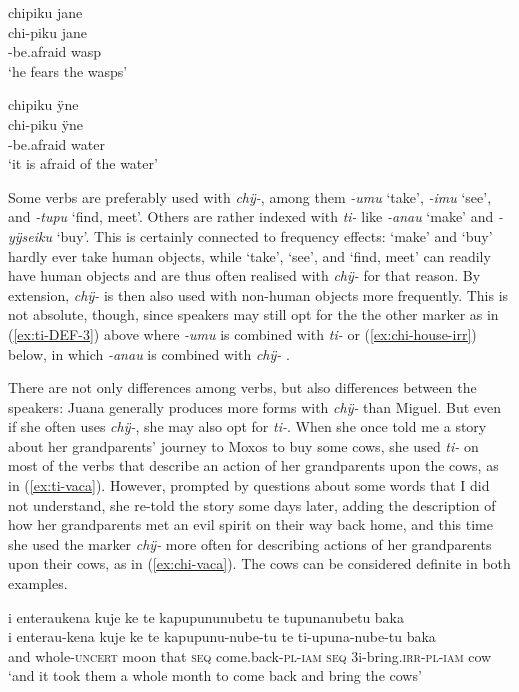 \ea\label{ex:fear}
\begingl 
\glpreamble chipiku jane\\
\gla chi-piku jane\\ 
-be.afraid wasp\\ 
\glft ‘he fears the wasps’\\ 
\endgl
\trailingcitation{[jxx-a120516l-a.125]}
\xe

\ea\label{ex:fear-2}
\begingl
\glpreamble chipiku ÿne\\
\gla chi-piku ÿne\\
-be.afraid water\\
\glft ‘it is afraid of the water’
\endgl
\trailingcitation{[jxx-a120516l-a.376]}
\xe

Some  verbs are preferably used with \textit{chÿ-}, among them \textit{-umu} ‘take’, \textit{-imu} ‘see’, and \textit{-tupu} ‘find, meet’. Others are rather indexed with \textit{ti-} like \textit{-anau} ‘make’ and \textit{-yÿseiku} ‘buy’. This is certainly connected to frequency effects: ‘make’ and ‘buy’ hardly ever take human objects, while ‘take’, ‘see’, and ‘find, meet’ can readily have human objects and are thus often realised with \textit{chÿ-} for that reason. By extension, \textit{chÿ-} is then also used with non-human objects more frequently. This is not absolute, though, since speakers may still opt for the the other marker as in  (\ref{ex:ti-DEF-3}) above where \textit{-umu} is combined with \textit{ti-} or  (\ref{ex:chi-house-irr}) below, in which \textit{-anau} is combined with \textit{chÿ-} .

There are not only differences among verbs, but also differences between the speakers: Juana generally produces more forms with \textit{chÿ-} than Miguel. But even if she often uses \textit{chÿ-}, she may also opt for \textit{ti-}. When she once told me a story about her grandparents’ journey to Moxos to buy some cows, she used \textit{ti-} on most of the verbs that describe an action of her grandparents upon the cows, as in (\ref{ex:ti-vaca}). However, prompted by questions about some words that I did not understand, she re-told the story some days later, adding the description of how her grandparents met an evil spirit on their way back home, and this time she used the marker \textit{chÿ-} more often for describing actions of her grandparents upon their cows, as in (\ref{ex:chi-vaca}). The cows can be considered definite in both examples.

\ea\label{ex:ti-vaca}
\begingl 
\glpreamble i enteraukena kuje ke te kapupununubetu te tupunanubetu baka\\
\gla i enterau-kena kuje ke te kapupunu-nube-tu te ti-upuna-nube-tu baka\\ 
\glb and whole-\textsc{uncert} moon that \textsc{seq} come.back-\textsc{pl}-\textsc{iam} \textsc{seq} 3i-bring.\textsc{irr}-\textsc{pl}-\textsc{iam} cow\\ 
\glft ‘and it took them a whole month to come back and bring the cows’\\ 
\endgl
\trailingcitation{[jxx-e150925l-1.206]}
\xe

